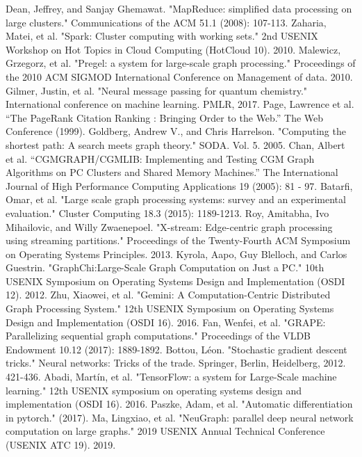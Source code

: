 \documentclass[conference]{IEEEtran}
\begin{document}
\begin{thebibliography}{00}
 Dean, Jeffrey, and Sanjay Ghemawat. "MapReduce: simplified data processing on large clusters." Communications of the ACM 51.1 (2008): 107-113.
 Zaharia, Matei, et al. "Spark: Cluster computing with working sets." 2nd USENIX Workshop on Hot Topics in Cloud Computing (HotCloud 10). 2010.
 Malewicz, Grzegorz, et al. "Pregel: a system for large-scale graph processing." Proceedings of the 2010 ACM SIGMOD International Conference on Management of data. 2010.
 Gilmer, Justin, et al. "Neural message passing for quantum chemistry." International conference on machine learning. PMLR, 2017.
 Page, Lawrence et al. “The PageRank Citation Ranking : Bringing Order to the Web.” The Web Conference (1999).
 Goldberg, Andrew V., and Chris Harrelson. "Computing the shortest path: A search meets graph theory." SODA. Vol. 5. 2005.
 Chan, Albert et al. “CGMGRAPH/CGMLIB: Implementing and Testing CGM Graph Algorithms on PC Clusters and Shared Memory Machines.” The International Journal of High Performance Computing Applications 19 (2005): 81 - 97.
 Batarfi, Omar, et al. "Large scale graph processing systems: survey and an experimental evaluation." Cluster Computing 18.3 (2015): 1189-1213.
 Roy, Amitabha, Ivo Mihailovic, and Willy Zwaenepoel. "X-stream: Edge-centric graph processing using streaming partitions." Proceedings of the Twenty-Fourth ACM Symposium on Operating Systems Principles. 2013.
 Kyrola, Aapo, Guy Blelloch, and Carlos Guestrin. "{GraphChi}:{Large-Scale} Graph Computation on Just a {PC}." 10th USENIX Symposium on Operating Systems Design and Implementation (OSDI 12). 2012.
 Zhu, Xiaowei, et al. "Gemini: A {Computation-Centric} Distributed Graph Processing System." 12th USENIX Symposium on Operating Systems Design and Implementation (OSDI 16). 2016.
 Fan, Wenfei, et al. "GRAPE: Parallelizing sequential graph computations." Proceedings of the VLDB Endowment 10.12 (2017): 1889-1892.
 Bottou, Léon. "Stochastic gradient descent tricks." Neural networks: Tricks of the trade. Springer, Berlin, Heidelberg, 2012. 421-436.
 Abadi, Martín, et al. "{TensorFlow}: a system for {Large-Scale} machine learning." 12th USENIX symposium on operating systems design and implementation (OSDI 16). 2016.
 Paszke, Adam, et al. "Automatic differentiation in pytorch." (2017).
 Ma, Lingxiao, et al. "{NeuGraph}: parallel deep neural network computation on large graphs." 2019 USENIX Annual Technical Conference (USENIX ATC 19). 2019.

\end{thebibliography}
\end{document}
